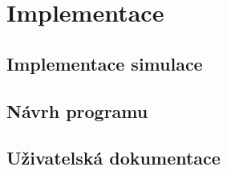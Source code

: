 \chapter{Implementace}

\section{Implementace simulace}

\section{Návrh programu}

\section{Uživatelská dokumentace}

